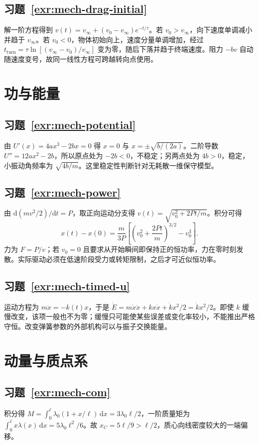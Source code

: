 \documentclass[UTF8,12pt,a4paper,fontset=fandol]{ctexbook}
\begin{document}
\subsection*{习题~\ref{exr:mech-drag-initial}}
解一阶方程得到 $v(t)=v_\infty+(v_0-v_\infty)e^{-t/\tau}$。若 $v_0>v_\infty$，向下速度单调减小并趋于 $v_\infty$。若 $v_0<0$，物体初始向上，速度分量单调增加，经过 $t_{\mathrm{turn}}=\tau\ln[(v_\infty-v_0)/v_\infty]$ 变为零，随后下落并趋于终端速度。阻力 $-bv$ 自动随速度变号，故同一线性方程可跨越转向点使用。

\section{功与能量}
\subsection*{习题~\ref{exr:mech-potential}}
由 $U'(x)=4ax^3-2bx=0$ 得 $x=0$ 与 $x=\pm\sqrt{b/(2a)}$。二阶导数 $U''=12ax^2-2b$，所以原点处为 $-2b<0$，不稳定；另两点处为 $4b>0$，稳定，小振动角频率为 $\sqrt{4b/m}$。这里稳定性判断针对无耗散一维保守模型。

\subsection*{习题~\ref{exr:mech-power}}
由 $\mathrm d(mv^2/2)/\mathrm dt=P$，取正向运动分支得 $v(t)=\sqrt{v_0^2+2Pt/m}$。积分可得
\[
 x(t)-x(0)=\frac{m}{3P}\left[\left(v_0^2+\frac{2Pt}{m}\right)^{3/2}-v_0^3\right].
\]
力为 $F=P/v$；若 $v_0=0$ 且要求从开始瞬间即保持正的恒功率，力在零时刻发散。实际驱动必须在低速阶段受力或转矩限制，之后才可近似恒功率。

\subsection*{习题~\ref{exr:mech-timed-u}}
运动方程为 $m\ddot x=-k(t)x$，于是 $\dot E=m\dot x\ddot x+kx\dot x+\dot kx^2/2=\dot kx^2/2$。即使 $k$ 缓慢改变，该项一般也不为零；缓慢只可能使某些误差或变化率较小，不能推出严格守恒。改变弹簧参数的外部机构可以与振子交换能量。

\section{动量与质点系}
\subsection*{习题~\ref{exr:mech-com}}
积分得 $M=\int_0^\ell\lambda_0(1+x/\ell)\,\mathrm dx=3\lambda_0\ell/2$，一阶质量矩为 $\int_0^\ell x\lambda(x)\,\mathrm dx=5\lambda_0\ell^2/6$。故 $x_C=5\ell/9>\ell/2$，质心向线密度较大的一端偏移。
\end{document}
